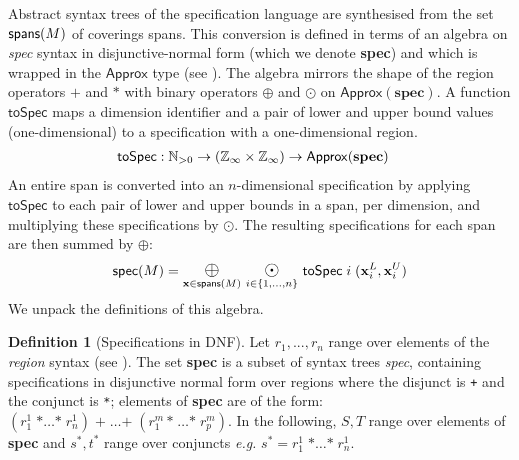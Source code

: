 \documentclass[10pt,preprint,numbers]{sigplanconf}
\newcounter{block}
\theoremstyle{definition}
\newtheorem{definition}[block]{Definition}
\newcommand{\eg}{\emph{e.g.}}
\newcommand{\term}[1]{\texttt{#1}}
\newcommand{\vect}[1]{\textbf{#1}}
\begin{document}
\newcommand{\oplusbig}{\operatornamewithlimits{\term{\Large{$\oplus$}}}}
\newcommand{\odobig}{\operatornamewithlimits{\term{\Large{$\odot$}}}}
\newcommand{\bplus}{\operatornamewithlimits{\term{\Large{+}}}}
\newcommand{\tySum}[1]{#1^{\term{+}}}
\newcommand{\tyProd}[1]{#1^{\term{*}}}
\newcommand{\specDNF}{\textbf{spec}}

Abstract syntax trees of the specification language
are synthesised from the set $\textsf{spans}(M)$ of coverings spans.
This conversion is defined in terms
of an algebra on \textit{spec} syntax in disjunctive-normal form
(which we denote \specDNF{}) and which is wrapped
in the $\textsf{Approx}$ type (see
).  The algebra mirrors the shape
of the region operators $\term{+}$ and $\term{*}$ 
with binary operators $\oplus$ and $\odot$ on
$\mathsf{Approx}(\specDNF)$.
A function $\mathsf{toSpec}$ maps a dimension identifier
and a pair of lower and upper bound
values (one-dimensional) to a specification with a one-dimensional region.
\begin{align*}
\mathsf{toSpec} & : \mathbb{N}_{>0} \rightarrow (\domainVal{} \times \domainVal{}) \rightarrow \mathsf{Approx}(\specDNF)
\end{align*}
An entire span is converted into an $n$-dimensional
specification by applying $\mathsf{toSpec}$ to each
pair of lower and upper bounds in a span, per dimension, and multiplying these
specifications by $\odot$. The resulting specifications for
each span are then summed by $\oplus$:
\begin{equation*}
\textsf{spec}(M) =
\oplusbig\limits_{\vect{x} \in \spanOp(M)} \,
\odobig\limits_{i \in \{1, \ldots, n\}} \, \mathsf{toSpec} \; i \; (\vect{x}^L_i, \vect{x}^U_i)
\end{equation*}
We unpack the definitions of this algebra.

\begin{definition}[Specifications in DNF]
Let $r_1, ..., r_n$ range over elements of the \textit{region}
syntax (see ).
The set \specDNF{} is a subset of syntax trees \textit{spec},
containing specifications in disjunctive normal form over regions
where the disjunct is \term{+} and the conjunct is \term{*}; 
 elements of \specDNF{} are of the form:
$
(r^1_{1} \; \term{*} \ldots \term{*} \; r^1_n)\; \term{+} \; \ldots
\term{+} \; (r^m_1 \, \term{*} \; \ldots \term{*} \; r^m_p)
$.
%
In the following, $S, T$ range over elements of
\specDNF{} and $\tyProd{s}, \tyProd{t}$ range over conjuncts
 \eg{} $\tyProd{s} = r^1_{1} \; \term{*}
\ldots \term{*} \; r^1_n$.
\end{definition}
\end{document}
